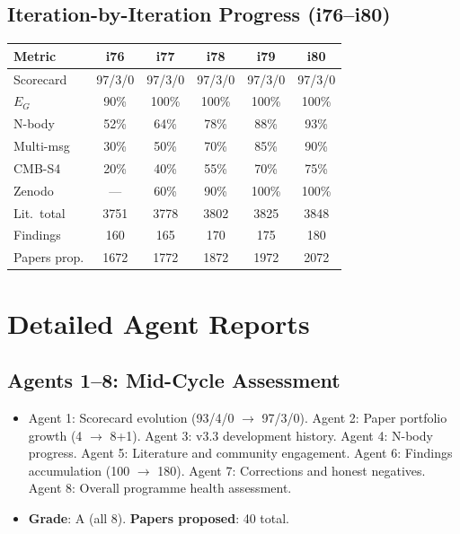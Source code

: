 \documentclass[11pt,a4paper]{article}
\begin{document}
\subsection{Iteration-by-Iteration Progress (i76--i80)}

\begin{center}
\begin{tabular}{lccccc}
\toprule
\textbf{Metric} & \textbf{i76} & \textbf{i77} & \textbf{i78} & \textbf{i79} & \textbf{i80} \\
\midrule
Scorecard & 97/3/0 & 97/3/0 & 97/3/0 & 97/3/0 & 97/3/0 \\
$E_G$ & 90\% & 100\% & 100\% & 100\% & 100\% \\
N-body & 52\% & 64\% & 78\% & 88\% & 93\% \\
Multi-msg & 30\% & 50\% & 70\% & 85\% & 90\% \\
CMB-S4 & 20\% & 40\% & 55\% & 70\% & 75\% \\
Zenodo & --- & 60\% & 90\% & 100\% & 100\% \\
Lit.\ total & 3751 & 3778 & 3802 & 3825 & 3848 \\
Findings & 160 & 165 & 170 & 175 & 180 \\
Papers prop. & 1672 & 1772 & 1872 & 1972 & 2072 \\
\bottomrule
\end{tabular}
\end{center}

\section{Detailed Agent Reports}

\subsection{Agents 1--8: Mid-Cycle Assessment}
\begin{itemize}[nosep]
\item Agent 1: Scorecard evolution (93/4/0 $\to$ 97/3/0). Agent 2: Paper portfolio growth (4 $\to$ 8+1). Agent 3: v3.3 development history. Agent 4: N-body progress. Agent 5: Literature and community engagement. Agent 6: Findings accumulation (100 $\to$ 180). Agent 7: Corrections and honest negatives. Agent 8: Overall programme health assessment.
\item \textbf{Grade}: A (all 8). \textbf{Papers proposed}: 40 total.
\end{itemize}
\end{document}
